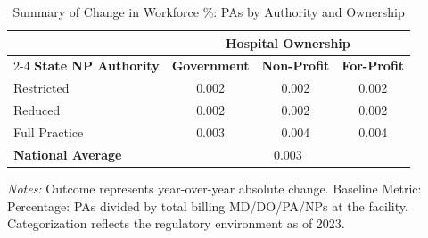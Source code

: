 \begin{table}[htbp]
    \centering
    \caption{Summary of Change in Workforce \%: PAs by Authority and Ownership}
    \label{tab:d_pct_pa_own}
    \vspace{0.2cm}
    \begin{tabular}{lccc}
        \toprule
        & \multicolumn{3}{c}{\textbf{Hospital Ownership}} \\
        \cmidrule(lr){2-4}
        \textbf{State NP Authority} & \textbf{Government} & \textbf{Non-Profit} & \textbf{For-Profit} \\
        \midrule
        Restricted & 0.002 & 0.002 & 0.002 \\
        Reduced & 0.002 & 0.002 & 0.002 \\
        Full Practice & 0.003 & 0.004 & 0.004 \\
        \midrule
        \textbf{National Average} & \multicolumn{3}{c}{0.003} \\
        \bottomrule
    \end{tabular}
    \vspace{0.1cm}
    \begin{minipage}{0.85\textwidth}
        \footnotesize \textit{Notes:} Outcome represents year-over-year absolute change. Baseline Metric: Percentage: PAs divided by total billing MD/DO/PA/NPs at the facility. Categorization reflects the regulatory environment as of 2023.
    \end{minipage}
\end{table}